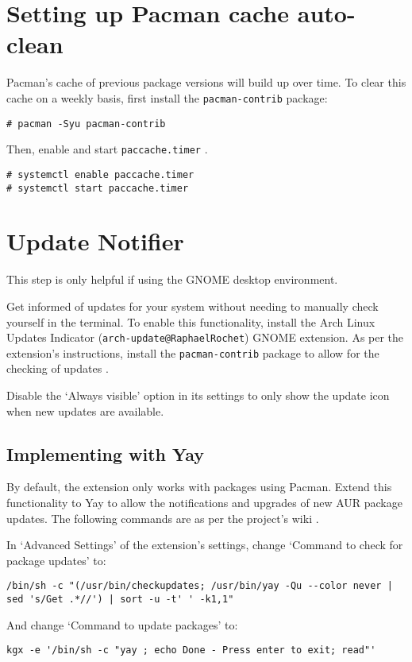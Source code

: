 \documentclass[a4paper]{article}
\begin{document}
\section{Setting up Pacman cache auto-clean}

Pacman's cache of previous package versions will build up over time.
To clear this cache on a weekly basis, first install the \lstinline|pacman-contrib| package:
\begin{lstlisting}
# pacman -Syu pacman-contrib
\end{lstlisting}

Then, enable and start \lstinline|paccache.timer| \cite{paccache-timer}.

\begin{lstlisting}
# systemctl enable paccache.timer
# systemctl start paccache.timer
\end{lstlisting}

\section{Update Notifier}

This step is only helpful if using the GNOME desktop environment.

Get informed of updates for your system without needing to manually check yourself in the terminal.
To enable this functionality, install the Arch Linux Updates Indicator (\lstinline|arch-update@RaphaelRochet|) GNOME extension.
As per the extension's instructions, install the \lstinline|pacman-contrib| package to allow for the checking of updates \cite{arch-update-wiki}.

Disable the `Always visible' option in its settings to only show the update icon when new updates are available.

\subsection{Implementing with Yay}

By default, the extension only works with packages using Pacman.
Extend this functionality to Yay to allow the notifications and upgrades of new AUR package updates.
The following commands are as per the project's wiki \cite{arch-update-wiki}.

In `Advanced Settings' of the extension's settings, change `Command to check for package updates' to:
\begin{lstlisting}
/bin/sh -c "(/usr/bin/checkupdates; /usr/bin/yay -Qu --color never | sed 's/Get .*//') | sort -u -t' ' -k1,1"
\end{lstlisting}
And change `Command to update packages' to:
\begin{lstlisting}
kgx -e '/bin/sh -c "yay ; echo Done - Press enter to exit; read"'
\end{lstlisting}
\end{document}

